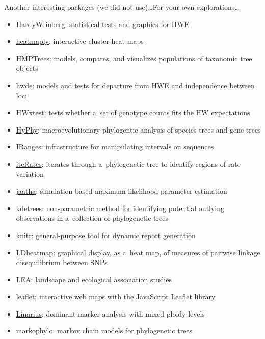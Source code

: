 \documentclass[compress, ucs, xelatex, 11pt, xcolor=svgnames,
	hyperref={
		bookmarks=true,
		unicode=true,
		colorlinks=true,
		pdftitle={Molecular data in R},
		plainpages=false,
		pdfauthor={Vojtech Zeisek},
		pdfsubject={Course about phylogeny and evolution in R},
		pdfcreator={XeLaTeX},
		pdfkeywords={R, evolution, phylogeny, molecular data},
		linkcolor=Tomato,
		anchorcolor=SaddleBrown,
		citecolor=Goldenrod,
		filecolor=DarkMagenta,
		menucolor=Sienna,
		urlcolor=DarkTurquoise,
		pdftex},
	url={hyphens, lowtilde} %
	]{beamer}
\begin{document}
\begin{frame}[allowframebreaks]{Another interesting packages (we did not use)\ldots}{For your own explorations\ldots}
\begin{itemize}
		\item \href{https://CRAN.R-project.org/package=HardyWeinberg}{HardyWeinberg}: statistical tests and graphics for HWE
		\item \href{https://CRAN.R-project.org/package=heatmaply}{heatmaply}: interactive cluster heat maps
		\item \href{https://CRAN.R-project.org/package=HMPTrees}{HMPTrees}: models, compares, and visualizes populations of taxonomic tree objects
		\item \href{https://CRAN.R-project.org/package=hwde}{hwde}: models and tests for departure from HWE and independence between loci
		\item \href{https://CRAN.R-project.org/package=HWxtest}{HWxtest}: tests whether a~set of genotype counts fits the HW expectations
		\item \href{https://CRAN.R-project.org/package=HyPhy}{HyPhy}: macroevolutionary phylogentic analysis of species trees and gene trees
		\item \href{https://bioconductor.org/packages/release/bioc/html/IRanges.html}{IRanges}: infrastructure for manipulating intervals on sequences
		\item \href{https://CRAN.R-project.org/package=iteRates}{iteRates}: iterates through a~phylogenetic tree to identify regions of rate variation
		\item \href{https://CRAN.R-project.org/package=jaatha}{jaatha}: simulation-based maximum likelihood parameter estimation
		\item \href{https://CRAN.R-project.org/package=kdetrees}{kdetrees}: non-parametric method for identifying potential outlying observations in a~collection of phylogenetic trees
		\item \href{https://CRAN.R-project.org/package=knitr}{knitr}: general-purpose tool for dynamic report generation
		\item \href{https://CRAN.R-project.org/package=LDheatmap}{LDheatmap}: graphical display, as a~heat map, of measures of pairwise linkage disequilibrium between SNPs
		\item \href{https://www.bioconductor.org/packages/release/bioc/html/LEA.html}{LEA}: landscape and ecological association studies
		\item \href{https://CRAN.R-project.org/package=leaflet}{leaflet}: interactive web maps with the JavaScript Leaflet library
		\item \href{https://github.com/giby/Linarius}{Linarius}: dominant marker analysis with mixed ploidy levels
		\item \href{https://CRAN.R-project.org/package=markophylo}{markophylo}: markov chain models for phylogenetic trees

\end{itemize}
\end{frame}
\end{document}
